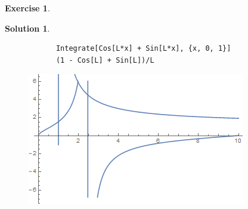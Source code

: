 \documentclass{article}
\theoremstyle{definition}
\newtheorem*{exer*}{Exercise}
\newtheorem*{sln*}{Solution}
\begin{document}
\begin{exer*}
\begin{enumerate}
\begin{sln*}
\begin{lstlisting}
			Integrate[Cos[L*x] + Sin[L*x], {x, 0, 1}]
			(1 - Cos[L] + Sin[L])/L
			\end{lstlisting}
			\begin{figure}[h!]
				\centering
				\includegraphics[scale=0.7]{pde_3_2.png}
			\end{figure}
		\end{sln*}
		
		
		
		
		
		\newpage
	\end{enumerate}
	
\end{exer*}

\newpage 
\end{document}
